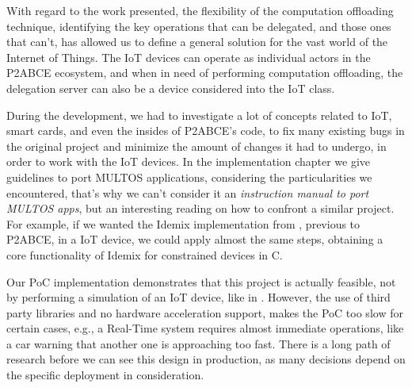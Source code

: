 \documentclass[journal]{IEEEtran}
\begin{document}
With regard to the work presented, the flexibility of the computation offloading technique, identifying the key operations that can be delegated, and those ones that can't, has allowed us to define a general solution for the vast world of the Internet of Things. The IoT devices can operate as individual actors in the P2ABCE ecosystem, and when in need of performing computation offloading, the delegation server can also be a device considered into the IoT class.




During the development, we had to investigate a lot of concepts related to IoT, smart cards, and even the insides of P2ABCE's code, to fix many existing bugs in the original project and minimize the amount of changes it had to undergo, in order to work with the IoT devices. In the implementation chapter we give guidelines to port MULTOS applications, considering the particularities we encountered, that's why we can't consider it an \textit{instruction manual to port MULTOS apps}, but an interesting reading on how to confront a similar project. For example, if we wanted the Idemix implementation from \cite{vullers2013efficient}, previous to P2ABCE, in a IoT device, we could apply almost the same steps, obtaining a core functionality of Idemix for constrained devices in C.

Our PoC implementation demonstrates that this project is actually feasible, not by performing a simulation of an IoT device, like in \cite{vanet}. However, the use of third party libraries and no hardware acceleration support, makes the PoC too slow for certain cases, e.g., a Real-Time system requires almost immediate operations, like a car warning that another one is approaching too fast.
There is a long path of research before we can see this design in production, as many decisions depend on the specific deployment in consideration.


\end{document}

